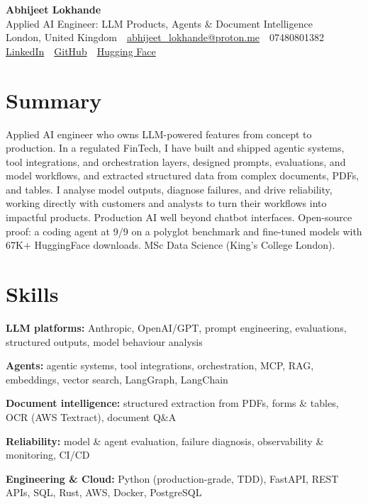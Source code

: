 \documentclass[10pt,a4paper]{article}
\newcommand{\sep}{\,\textcolor{accent!60}{\textbar}\,}
\begin{document}
\begin{center}
  {\fontsize{24}{26}\selectfont\bfseries Abhijeet Lokhande}\\[3pt]
  {\color{accent}\large Applied AI Engineer: LLM Products, Agents \& Document Intelligence}\\[5pt]
  {\small
    London, United Kingdom \sep
    \href{mailto:abhijeet_lokhande@proton.me}{abhijeet\_lokhande@proton.me} \sep
    07480801382 \\[2pt]
    \href{https://www.linkedin.com/in/ablds/}{LinkedIn} \sep
    \href{https://github.com/abhijeetscode}{GitHub} \sep
    \href{https://huggingface.co/ab-ai}{Hugging Face}
  }
\end{center}
\vspace{2pt}

\section{Summary}
Applied AI engineer who owns LLM-powered features from concept to production. In a regulated FinTech, I have built and shipped agentic systems, tool integrations, and orchestration layers, designed prompts, evaluations, and model workflows, and extracted structured data from complex documents, PDFs, and tables. I analyse model outputs, diagnose failures, and drive reliability, working directly with customers and analysts to turn their workflows into impactful products. Production AI well beyond chatbot interfaces. Open-source proof: a coding agent at 9/9 on a polyglot benchmark and fine-tuned models with 67K+ HuggingFace downloads. MSc Data Science (King's College London).

\section{Skills}
\begin{tight}
  \item[\textcolor{accent}{\small$\bullet$}] \textbf{LLM platforms:} Anthropic, OpenAI/GPT, prompt engineering, evaluations, structured outputs, model behaviour analysis
  \item[\textcolor{accent}{\small$\bullet$}] \textbf{Agents:} agentic systems, tool integrations, orchestration, MCP, RAG, embeddings, vector search, LangGraph, LangChain
  \item[\textcolor{accent}{\small$\bullet$}] \textbf{Document intelligence:} structured extraction from PDFs, forms \& tables, OCR (AWS Textract), document Q\&A
  \item[\textcolor{accent}{\small$\bullet$}] \textbf{Reliability:} model \& agent evaluation, failure diagnosis, observability \& monitoring, CI/CD
  \item[\textcolor{accent}{\small$\bullet$}] \textbf{Engineering \& Cloud:} Python (production-grade, TDD), FastAPI, REST APIs, SQL, Rust, AWS, Docker, PostgreSQL
\end{tight}
\end{document}
